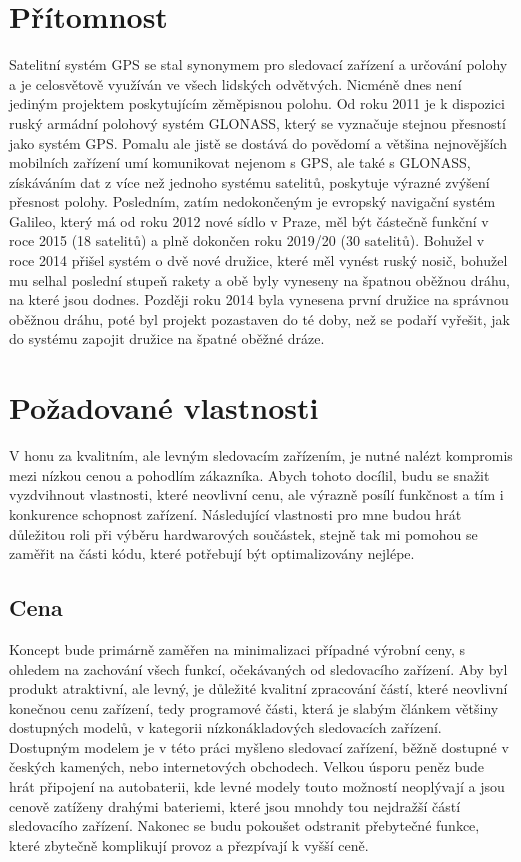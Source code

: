 \documentclass[FM,BP]{tulthesis}  %
\begin{document}
\section{Přítomnost}
Satelitní systém GPS se stal synonymem pro sledovací zařízení a určování polohy a je celosvětově využíván ve všech lidských odvětvých. Nicméně dnes není jediným projektem poskytujícím zěměpisnou polohu. Od roku 2011 je k dispozici ruský armádní polohový systém GLONASS, který se vyznačuje stejnou přesností jako systém GPS. Pomalu ale jistě se dostává do povědomí a většina nejnovějších mobilních zařízení umí komunikovat nejenom s GPS, ale také s GLONASS, získáváním dat z více než jednoho systému satelitů, poskytuje výrazné zvýšení přesnost polohy. Posledním, zatím nedokončeným je evropský navigační systém Galileo, který má od roku 2012 nové sídlo v Praze, měl být částečně funkční v roce 2015 (18 satelitů) a plně dokončen roku 2019/20 (30 satelitů). Bohužel v roce 2014 přišel systém o dvě nové družice, které měl vynést ruský nosič, bohužel mu selhal poslední stupeň rakety a obě byly vyneseny na špatnou oběžnou dráhu, na které jsou dodnes. Později roku 2014 byla vynesena první družice na správnou oběžnou dráhu, poté byl projekt pozastaven do té doby, než se podaří vyřešit, jak do systému zapojit družice na špatné oběžné dráze.


\section{Požadované vlastnosti}
V honu za kvalitním, ale levným sledovacím zařízením, je nutné nalézt kompromis mezi nízkou cenou a pohodlím zákazníka. Abych tohoto docílil, budu se snažit vyzdvihnout vlastnosti, které neovlivní cenu, ale výrazně posílí funkčnost a tím i konkurence schopnost zařízení. Následující vlastnosti pro mne budou hrát důležitou roli při výběru hardwarových součástek, stejně tak mi pomohou se zaměřit na části kódu, které potřebují být optimalizovány nejlépe.

\subsection{Cena}
Koncept bude primárně zaměřen na minimalizaci případné výrobní ceny, s ohledem na zachování všech funkcí, očekávaných od sledovacího zařízení. Aby byl produkt atraktivní, ale levný, je důležité kvalitní zpracování částí, které neovlivní konečnou cenu zařízení, tedy programové části, která je slabým článkem většiny dostupných modelů, v kategorii nízkonákladových sledovacích zařízení. Dostupným modelem je v této práci myšleno sledovací zařízení, běžně dostupné v českých kamených, nebo internetových obchodech. Velkou úsporu peněz bude hrát připojení na autobaterii, kde levné modely touto možností neoplývají a jsou cenově zatíženy drahými bateriemi, které jsou mnohdy tou nejdražší částí sledovacího zařízení. Nakonec se budu pokoušet odstranit přebytečné funkce, které zbytečně komplikují provoz a přezpívají k vyšší ceně.
\end{document}
